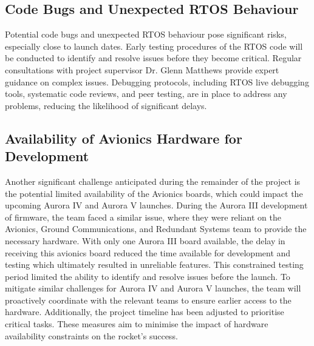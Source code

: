 \subsection{Code Bugs and Unexpected RTOS Behaviour}
Potential code bugs and unexpected RTOS behaviour pose significant risks, especially close to launch dates. Early testing procedures of the RTOS code will be conducted to identify and resolve issues before they become critical. Regular consultations with project supervisor Dr. Glenn Matthews provide expert guidance on complex issues. Debugging protocols, including RTOS live debugging tools, systematic code reviews, and peer testing, are in place to address any problems, reducing the likelihood of significant delays.

\subsection{Availability of Avionics Hardware for Development}
Another significant challenge anticipated during the remainder of the project is the potential limited availability of the Avionics boards, which could impact the upcoming Aurora IV and Aurora V launches. During the Aurora III development of firmware, the team faced a similar issue, where they were reliant on the Avionics, Ground Communications, and Redundant Systems team to provide the necessary hardware. With only one Aurora III board available, the delay in receiving this avionics board reduced the time available for development and testing which ultimately resulted in unreliable features. This constrained testing period limited the ability to identify and resolve issues before the launch. To mitigate similar challenges for Aurora IV and Aurora V launches, the team will proactively coordinate with the relevant teams to ensure earlier access to the hardware. Additionally, the project timeline has been adjusted to prioritise critical tasks. These measures aim to minimise the impact of hardware availability constraints on the rocket's success. 

